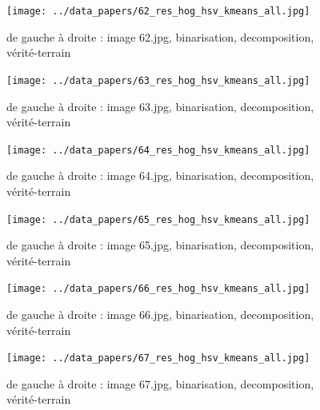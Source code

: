 \documentclass{book}
\begin{document}
\begin{figure}[H]
\begin{center}
\texttt{[image: ../data\_papers/62\_res\_hog\_hsv\_kmeans\_all.jpg]}
\end{center}
\caption{de gauche à droite : image 62.jpg, binarisation, decomposition, vérité-terrain}
\label{62}
\end{figure}
\clearpage


\begin{figure}[H]
\begin{center}
\texttt{[image: ../data\_papers/63\_res\_hog\_hsv\_kmeans\_all.jpg]}
\end{center}
\caption{de gauche à droite : image 63.jpg, binarisation, decomposition, vérité-terrain}
\label{63}
\end{figure}
\clearpage


\begin{figure}[H]
\begin{center}
\texttt{[image: ../data\_papers/64\_res\_hog\_hsv\_kmeans\_all.jpg]}
\end{center}
\caption{de gauche à droite : image 64.jpg, binarisation, decomposition, vérité-terrain}
\label{64}
\end{figure}
\clearpage


\begin{figure}[H]
\begin{center}
\texttt{[image: ../data\_papers/65\_res\_hog\_hsv\_kmeans\_all.jpg]}
\end{center}
\caption{de gauche à droite : image 65.jpg, binarisation, decomposition, vérité-terrain}
\label{65}
\end{figure}
\clearpage


\begin{figure}[H]
\begin{center}
\texttt{[image: ../data\_papers/66\_res\_hog\_hsv\_kmeans\_all.jpg]}
\end{center}
\caption{de gauche à droite : image 66.jpg, binarisation, decomposition, vérité-terrain}
\label{66}
\end{figure}
\clearpage


\begin{figure}[H]
\begin{center}
\texttt{[image: ../data\_papers/67\_res\_hog\_hsv\_kmeans\_all.jpg]}
\end{center}
\caption{de gauche à droite : image 67.jpg, binarisation, decomposition, vérité-terrain}
\label{67}
\end{figure}
\clearpage
\end{document}
